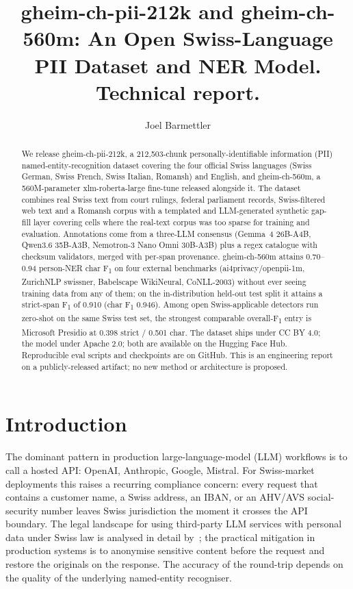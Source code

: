 \documentclass[sigconf,nonacm]{acmart}
\title{gheim-ch-pii-212k and gheim-ch-560m: An Open Swiss-Language PII Dataset and NER Model. Technical report.}
\author{Joel Barmettler}
\affiliation{%
  \institution{Independent}
  \city{Zürich}
  \country{Switzerland}
}
\begin{document}
\begin{abstract}
We release \textsf{gheim-ch-pii-212k}, a 212{,}503-chunk personally-identifiable
information (PII) named-entity-recognition dataset covering the four
official Swiss languages (Swiss German, Swiss French, Swiss Italian,
Romansh) and English, and \textsf{gheim-ch-560m}, a 560M-parameter
\textsf{xlm-roberta-large} fine-tune released alongside it. The dataset
combines real Swiss text from court rulings, federal parliament records,
Swiss-filtered web text and a Romansh corpus with a templated and
LLM-generated synthetic gap-fill layer covering cells where the
real-text corpus was too sparse for training and evaluation.
Annotations come from a three-LLM consensus (Gemma~4 26B-A4B,
Qwen3.6 35B-A3B, Nemotron-3 Nano Omni 30B-A3B) plus a regex catalogue
with checksum validators, merged with per-span provenance.
\textsf{gheim-ch-560m} attains 0.70--0.94 person-NER char F\textsubscript{1}
on four external benchmarks
(\textsf{ai4privacy/openpii-1m}, ZurichNLP \textsf{swissner},
Babelscape \textsf{WikiNeural}, CoNLL-2003) without ever seeing
training data from any of them; on the in-distribution held-out test
split it attains a strict-span F\textsubscript{1} of 0.910 (char
F\textsubscript{1} 0.946). Among open Swiss-applicable detectors run
zero-shot on the same Swiss test set, the strongest comparable
overall-F\textsubscript{1} entry is Microsoft Presidio at 0.398
strict / 0.501 char.
The dataset ships under CC BY 4.0; the model under Apache 2.0; both
are available on the Hugging Face Hub. Reproducible eval scripts and
checkpoints are on GitHub. This is an engineering report on a
publicly-released artifact; no new method or architecture is proposed.
\end{abstract}

\maketitle

\section{Introduction}
\label{sec:intro}

The dominant pattern in production large-language-model (LLM) workflows
is to call a hosted API: OpenAI, Anthropic, Google, Mistral. For
Swiss-market deployments this raises a recurring compliance concern:
every request that contains a customer name, a Swiss address, an IBAN,
or an AHV/AVS social-security number leaves Swiss jurisdiction the
moment it crosses the API boundary. The legal landscape for using
third-party LLM services with personal data under Swiss law is
analysed in detail by~\citet{rosenthal2025jusletter}; the practical
mitigation in production systems is to anonymise sensitive content
before the request and restore the originals on the response. The
accuracy of the round-trip depends on the quality of the underlying
named-entity recogniser.
\end{document}
